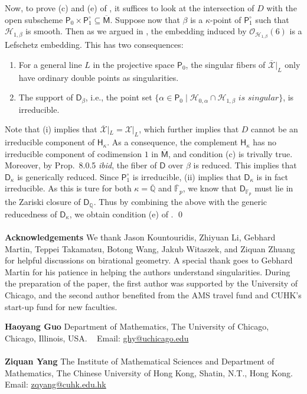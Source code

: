 \documentclass[11pt, letterpaper]{amsart}
\theoremstyle{plain}
\theoremstyle{definition}
\newcommand{\IF}{\mathbb{F}}
\newcommand{\IQ}{\mathbb{Q}}
\newcommand{\<}{\langle}
\renewcommand{\>}{\rangle}
\newcommand{\sH}{\mathcal{H}}
\newcommand{\sO}{\mathcal{O}}
\newcommand{\sfD}{\mathsf{D}}
\newcommand{\sfM}{\mathsf{M}}
\newcommand{\sX}{\mathcal{X}}
\newcommand{\sfH}{\mathsf{H}}
\begin{document}
Now, to prove (c) and (e) of , it suffices to look at the intersection of $D$ with the open subscheme $\mathsf{P}_0 \times \mathsf{P}^\circ_1 \subseteq \overline{\sfM}$. 
Suppose now that $\beta$ is a $\kappa$-point of $\mathsf{P}^\circ_1$ such that $\sH_{1, \beta}$ is smooth. 
Then as we argued in \cite[Prop.~8.0.3]{HYZ}, the embedding induced by $\sO_{\sH_{1, \beta}}(6)$ is a Lefschetz embedding. 
This has two consequences: 
\begin{enumerate}[label=\upshape{(\roman*)}]
    \item For a general line $L$ in the projective space $\mathsf{P}_0$, the singular fibers of $\overline{\sX}|_L$ only have ordinary double points as singularities. 
    \item The support of $\sfD_{\beta}$, i.e., the point set $\{ \alpha \in \mathsf{P}_0 \mid \sH_{0, \alpha} \cap \sH_{1, \beta} \textit{ is singular} \}$, is irreducible. 
\end{enumerate}
Note that (i) implies that $\overline{\sX}|_L = \sX|_L$, which further implies that $D$ cannot be an irreducible component of $\sfH_\kappa$. 
As a consequence, the complement $\sfH_\kappa$ has no irreducible component of codimension $1$ in $\overline{\sfM}$, and condition (c) is trivally true. 
Moreover, by Prop.~8.0.5 \textit{ibid}, the fiber of $\sfD$ over $\beta$ is reduced. 
This implies that $\sfD_\kappa$ is generically reduced. Since $\mathsf{P}^\circ_1$ is irreducible, (ii) implies that $\sfD_\kappa$ is in fact irreducible. 
As this is ture for both $\kappa = \overline{\IQ}$ and $\overline{\IF}_p$, we know that $\sfD_{\IF_p}$ must lie in the Zariski closure of $\sfD_\IQ$. 
Thus by combining the above with the generic reducedness of $\sfD_\kappa$, we obtain condition (e) of . \qed\\\\
\noindent \textbf{Acknowledgements} We thank Jason Kountouridis, Zhiyuan Li, Gebhard Martin, Teppei Takamatsu, Botong Wang, Jakub Witaszek, and Ziquan Zhuang for helpful discussions on birational geometry. A special thank goes to Gebhard Martin for his patience in helping the authors understand singularities. During the preparation of the paper, the first author was supported by the University of Chicago, and the second author benefited from the AMS travel fund and CUHK's start-up fund for new faculties. 






\printbibliography

\vspace{2em}

\noindent \textbf{Haoyang Guo} {\footnotesize Department of Mathematics, The University of Chicago, Chicago, Illinois, USA.  \,\,\,  Email: \url{ghy@uchicago.edu}}\\\\
\noindent \textbf{Ziquan Yang} {\footnotesize The Institute of Mathematical Sciences and Department of Mathematics, The Chinese University of Hong Kong, Shatin, N.T., Hong Kong.  \,\,\,  Email: \url{zqyang@cuhk.edu.hk}}
\end{document}
